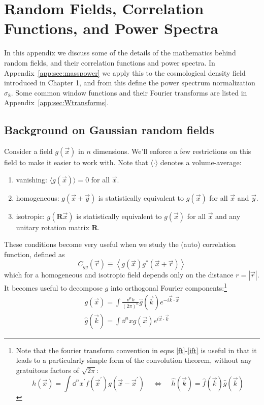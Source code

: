 \chapter{Random Fields, Correlation Functions, and Power Spectra}
\label{app:RandomFields}

In this appendix we discuss some of the details of the mathematics behind
random fields, and their correlation functions and power spectra.
In Appendix~\ref{app:sec:masspower} we
apply this to the cosmological density field introduced in
Chapter 1, and from this define the power spectrum normalization
$\sigma_8$.
Some common window functions and their Fourier transforms are listed
in Appendix~\ref{app:sec:Wtransforms}.

\section{Background on Gaussian random fields}
\label{app:sec:background}
Consider a field $g(\vec x)$ in $n$ dimensions. We'll enforce a 
few restrictions on this field to make it easier to work with.
Note that $\langle\cdot\rangle$ denotes a volume-average:
\begin{enumerate}
  \item vanishing: $\langle g(\vec x)\rangle=0$ 
    for all $\vec x$.
  \item homogeneous: $g(\vec x + \vec y)$ is statistically equivalent to
    $g(\vec x)$ for all $\vec x$ and $\vec y$.
  \item isotropic: $g(\mathbf{R}\vec x)$ is statistically equivalent to
    $g(\vec x)$ for all $\vec x$ and any unitary rotation matrix $\mathbf{R}$.
\end{enumerate}
These conditions become very useful when we study the 
(auto) correlation function, defined as
\begin{equation}
  \label{Cgg}
  C_{gg}(\vec r) \equiv \left\langle g(\vec x) g^*(\vec x+\vec{r})\right\rangle
\end{equation}
which for a homogeneous and isotropic field depends only on the 
distance $r = |\vec r|$.  It becomes useful to decompose $g$ into
orthogonal Fourier components:\footnote{
  Note that the fourier transform convention in eqns \ref{ft}-\ref{ift}
  is useful in that it leads to a particularly simple form of the 
  convolution theorem, without any gratuitous factors of $\sqrt{2\pi}$:
  \begin{displaymath}
    h(\vec x) = \int\dd^nx^\prime 
    f(\vec x^\prime)g(\vec x-\vec x^\prime)
    \ \ \ \ \ \Longleftrightarrow\ \ \ \ \ 
    \hat h(\vec k) = \hat f(\vec k)\hat g(\vec k)
  \end{displaymath}
}
\begin{eqnarray}
  \label{ft}
  g(\vec x) = \int \frac{\dd^nk}{(2\pi)^n} \hat{g}(\vec k)
  e^{-i\vec k\cdot\vec x}\\
  \label{ift}
  \hat{g}(\vec k) = \int \dd^nx g(\vec x)e^{i\vec x\cdot\vec k}
\end{eqnarray}

